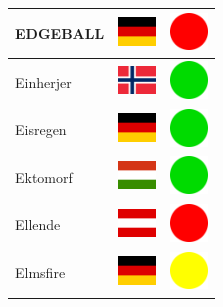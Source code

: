 \documentclass[12pt, a4paper, twoside]{report}
\begin{document}
\begin{center}
\begin{longtable}{|p{5cm}|p{2cm}|p{2cm}|}
EDGEBALL & \includegraphics[width=1cm]{4x3/de} & \includegraphics[width=1cm]{likes/n} \\ \hline
Einherjer & \includegraphics[width=1cm]{4x3/no} & \includegraphics[width=1cm]{likes/y} \\ \hline
Eisregen & \includegraphics[width=1cm]{4x3/de} & \includegraphics[width=1cm]{likes/y} \\ \hline
Ektomorf & \includegraphics[width=1cm]{4x3/hu} & \includegraphics[width=1cm]{likes/y} \\ \hline
Ellende & \includegraphics[width=1cm]{4x3/at} & \includegraphics[width=1cm]{likes/n} \\ \hline
Elmsfire & \includegraphics[width=1cm]{4x3/de} & \includegraphics[width=1cm]{likes/m} \\ \hline

\end{longtable}
\end{center}
\end{document}
